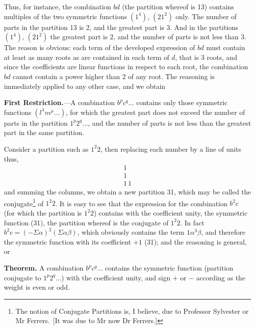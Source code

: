 \documentclass[11pt]{article}
\begin{document}
\medskip

Thus, for instance, the combination $bd$ (the partition whereof is 13) contains multiples of the two symmetric functions $(1^4)$, $(21^2)$ only. The number of parts in the partition 13 is 2, and the greatest part is 3. And in the partitions $(1^4)$, $(21^2)$ the greatest part is 2, and the number of parts is not less than 3. The reason is obvious: each term of the developed expression of $bd$ must contain at least as many roots as are contained in each term of $d$, that is 3 roots, and since the coefficients are linear functions in respect to each root, the combination $bd$ cannot contain a power higher than 2 of any root. The reasoning is immediately applied to any other case, and we obtain

\medskip

\noindent\textbf{First Restriction.}---A combination $b^p c^q\ldots$ contains only those symmetric functions $(l^\lambda m^\mu\ldots)$, for which the greatest part does not exceed the number of parts in the partition $1^p 2^q\ldots$, and the number of parts is not less than the greatest part in the same partition.

\medskip

Consider a partition such as $1^2 2$, then replacing each number by a line of units thus,
\[
\begin{array}{c} 1 \\ 1 \\ 1\,1 \end{array}
\]
and summing the columns, we obtain a new partition 31, which may be called the conjugate\footnote{The notion of Conjugate Partitions is, I believe, due to Professor Sylvester or Mr Ferrers.\ [It was due to Mr now Dr Ferrers.]} of $1^2 2$. It is easy to see that the expression for the combination $b^2 c$ (for which the partition is $1^2 2$) contains with the coefficient unity, the symmetric function (31), the partition whereof is the conjugate of $1^2 2$. In fact $b^2 c = (-\Sigma\alpha)^2 (\Sigma\alpha\beta)$, which obviously contains the term $1\alpha^3\beta$, and therefore the symmetric function with its coefficient $+1$ (31); and the reasoning is general, or

\medskip

\noindent\textbf{Theorem.} A combination $b^p c^q\ldots$ contains the symmetric function (partition conjugate to $1^p 2^q\ldots$) with the coefficient unity, and sign $+$ or $-$ according as the weight is even or odd.

\medskip
\end{document}
